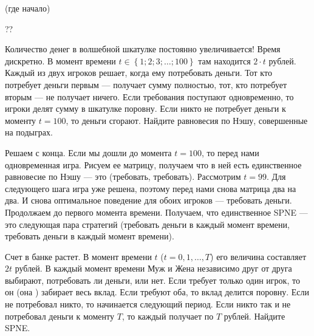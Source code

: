 \begin{problem} (где начало)
\begin{source}
\cite[2.111]{osborne:igt}??
\end{source}
Количество денег в волшебной шкатулке постоянно увеличивается! Время дискретно. В момент времени  $t\in \left\{1;2;3;\ldots ;100\right\}$  там находится  $2\cdot t$  рублей. Каждый из двух игроков решает, когда ему потребовать деньги. Тот кто потребует деньги первым — получает сумму полностью, тот, кто потребует вторым — не получает ничего. Если требования поступают одновременно, то игроки делят сумму в шкатулке поровну. Если никто не потребует деньги к моменту  $t=100$, то деньги сгорают. Найдите равновесия по Нэшу, совершенные на подыграх.\par

\begin{sol}
Решаем с конца. Если мы дошли до момента $t=100$, то перед нами одновременная игра. Рисуем ее матрицу, получаем что в ней есть единственное равновесие по Нэшу — это (требовать, требовать). Рассмотрим $t=99$. Для следующего шага игра уже решена, поэтому перед нами снова матрица два на два. И снова оптимальное поведение для обоих игроков — требовать деньги. Продолжаем до первого момента времени. Получаем, что единственное SPNE — это следующая пара стратегий (требовать деньги в каждый момент времени, требовать деньги в каждый момент времени).
\end{sol}
\end{problem}






\begin{problem}
 Счет в банке растет. В момент времени $t$ ($t=0,1,\ldots,T$) его
величина составляет $2t$ рублей. В каждый момент времени Муж и
Жена независимо друг от друга выбирают, потребовать ли деньги, или
нет. Если требует только один игрок, то он (она ) забирает весь
вклад. Если требуют оба, то вклад делится поровну. Если не
потребовал никто, то начинается следующий период. Если никто так и
не потребовал деньги к моменту $T$, то каждый получает по $T$
рублей. Найдите SPNE.

\begin{sol}

\end{sol}
\end{problem}




